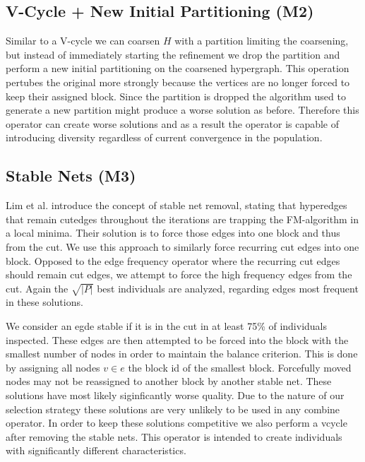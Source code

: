 \documentclass[a4paper,12pt,titlepage, BCOR7mm,headsepline]{scrbook}
\numberwithin{equation}{section}
\begin{document}
\subsection{V-Cycle + New Initial Partitioning (M2)}
Similar to a V-cycle we can coarsen $H$ with a partition limiting the coarsening, but instead of immediately starting the refinement we drop the partition and perform a new initial partitioning on the coarsened hypergraph. This operation pertubes the original more strongly because the vertices are no longer forced to keep their assigned block. Since the partition is
dropped the algorithm used to generate a new partition might produce a worse solution as before. Therefore this operator can create worse solutions and as a result the operator is capable of introducing diversity regardless of current convergence in the population. 
\subsection{Stable Nets (M3)}
Lim et al. \cite{lim1997large} introduce the concept of stable net removal, stating that hyperedges that remain cutedges throughout the iterations are trapping the FM-algorithm in a local minima. Their solution is to force those edges into one block and thus from the cut. 
We use this approach to similarly force recurring cut edges into one block. 
Opposed to the edge frequency operator where the recurring cut edges should remain cut edges, we attempt to force the high frequency edges from the cut.
Again the $\sqrt{|P|}$ best individuals are analyzed, regarding edges most frequent in these solutions. 

We consider an egde stable if it is in the cut in at least 75\% of individuals inspected.
These edges are then attempted to be forced into the block with the smallest number of nodes in order to maintain the balance criterion. This is done by assigning all nodes $ v \in e$ the block id of the smallest block.
Forcefully moved nodes may not be reassigned to another block by another stable net.
These solutions have most likely siginficantly worse quality. Due to the nature of our selection strategy these solutions are very unlikely to be used in any combine operator. In order to keep these solutions competitive we also perform a vcycle after removing the stable nets. This operator is intended to create individuals with significantly different characteristics. 
\end{document}
